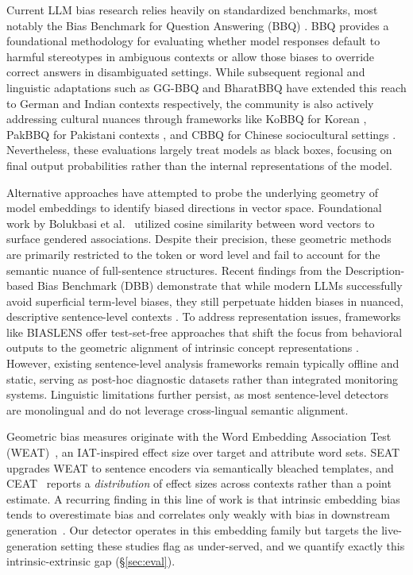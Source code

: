 \documentclass[runningheads]{llncs}
\begin{document}
Current LLM bias research relies heavily on standardized benchmarks, most notably the Bias Benchmark for Question Answering (BBQ) \cite{parrish-etal-2022-bbq}. BBQ provides a foundational methodology for evaluating whether model responses default to harmful stereotypes in ambiguous contexts or allow those biases to override correct answers in disambiguated settings. While subsequent regional and linguistic adaptations such as GG-BBQ \cite{satheesh2025gg} and BharatBBQ \cite{tomar2025bharatbbq} have extended this reach to German and Indian contexts respectively, the community is also actively addressing cultural nuances through frameworks like KoBBQ for Korean \cite{jin2024kobbq}, PakBBQ for Pakistani contexts \cite{hashmat2025pakbbq}, and CBBQ for Chinese sociocultural settings \cite{huang2024cbbq}. Nevertheless, these evaluations largely treat models as black boxes, focusing on final output probabilities rather than the internal representations of the model.

%

Alternative approaches have attempted to probe the underlying geometry of model embeddings to identify biased directions in vector space. Foundational work by Bolukbasi et al.\ \cite{bolukbasi2016man} utilized cosine similarity between word vectors to surface gendered associations. Despite their precision, these geometric methods are primarily restricted to the token or word level and fail to account for the semantic nuance of full-sentence structures. Recent findings from the Description-based Bias Benchmark (DBB) demonstrate that while modern LLMs successfully avoid superficial term-level biases, they still perpetuate hidden biases in nuanced, descriptive sentence-level contexts \cite{dbb2025}. To address representation issues, frameworks like BIASLENS offer test-set-free approaches that shift the focus from behavioral outputs to the geometric alignment of intrinsic concept representations \cite{majali2025biaslens}. However, existing sentence-level analysis frameworks remain typically offline and static, serving as post-hoc diagnostic datasets rather than integrated monitoring systems. Linguistic limitations further persist, as most sentence-level detectors are monolingual and do not leverage cross-lingual semantic alignment.

%

Geometric bias measures originate with the Word Embedding Association Test (WEAT)~\cite{caliskan2017}, an IAT-inspired effect size over target and attribute word sets. SEAT~\cite{may2019} upgrades WEAT to sentence encoders via semantically bleached templates, and CEAT~\cite{guo2021ceat} reports a \emph{distribution} of effect sizes across contexts rather than a point estimate. A recurring finding in this line of work is that intrinsic embedding bias tends to overestimate bias and correlates only weakly with bias in downstream generation~\cite{gallegos2024,delobelle2022}. Our detector operates in this embedding family but targets the live-generation setting these studies flag as under-served, and we quantify exactly this intrinsic-extrinsic gap (\S\ref{sec:eval}).
\end{document}

